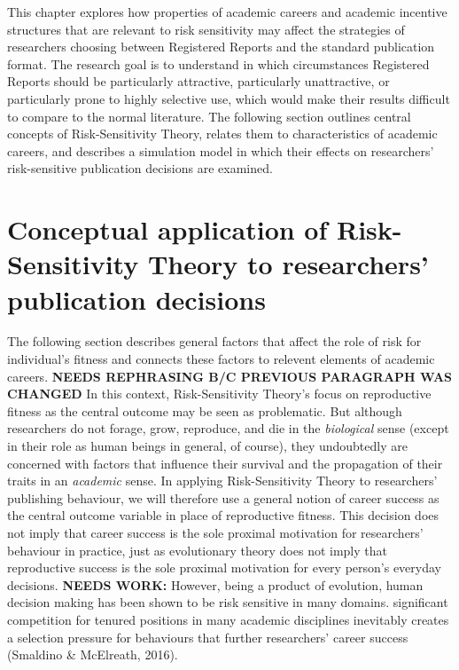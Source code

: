 \documentclass[british,,man,floatsintext]{apa6}
\begin{document}
This chapter explores how properties of academic careers and academic incentive structures that are relevant to risk sensitivity may affect the strategies of researchers choosing between Registered Reports and the standard publication format.
The research goal is to understand in which circumstances Registered Reports should be particularly attractive, particularly unattractive, or particularly prone to highly selective use, which would make their results difficult to compare to the normal literature.
The following section outlines central concepts of Risk-Sensitivity Theory, relates them to characteristics of academic careers, and describes a simulation model in which their effects on researchers' risk-sensitive publication decisions are examined.

\hypertarget{conceptual-application-of-risk-sensitivity-theory-to-researchers-publication-decisions}{%
\section{Conceptual application of Risk-Sensitivity Theory to researchers' publication decisions}\label{conceptual-application-of-risk-sensitivity-theory-to-researchers-publication-decisions}}

The following section describes general factors that affect the role of risk for individual's fitness and connects these factors to relevent elements of academic careers. \textbf{NEEDS REPHRASING B/C PREVIOUS PARAGRAPH WAS CHANGED}
In this context, Risk-Sensitivity Theory's focus on reproductive fitness as the central outcome may be seen as problematic.
But although researchers do not forage, grow, reproduce, and die in the \emph{biological} sense (except in their role as human beings in general, of course), they undoubtedly are concerned with factors that influence their survival and the propagation of their traits in an \emph{academic} sense.
In applying Risk-Sensitivity Theory to researchers' publishing behaviour, we will therefore use a general notion of career success as the central outcome variable in place of reproductive fitness.
This decision does not imply that career success is the sole proximal motivation for researchers' behaviour in practice, just as evolutionary theory does not imply that reproductive success is the sole proximal motivation for every person's everyday decisions.
\textbf{NEEDS WORK:}
However, being a product of evolution, human decision making has been shown to be risk sensitive in many domains.
significant competition for tenured positions in many academic disciplines inevitably creates a selection pressure for behaviours that further researchers' career success (Smaldino \& McElreath, 2016).
\end{document}
